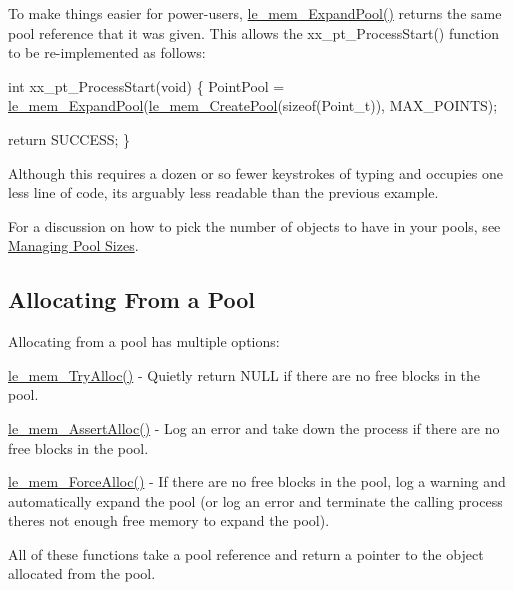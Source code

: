 To make things easier for power-\/users, {\ttfamily \hyperlink{le__mem_8h_a79a4321ffa0345f267eaf3b7d3d3528a}{le\+\_\+mem\+\_\+\+Expand\+Pool()}} returns the same pool reference that it was given. This allows the xx\+\_\+pt\+\_\+\+Process\+Start() function to be re-\/implemented as follows\+: 
\begin{DoxyCode}
\textcolor{keywordtype}{int} xx\_pt\_ProcessStart(\textcolor{keywordtype}{void})
\{
    PointPool = \hyperlink{le__mem_8h_a79a4321ffa0345f267eaf3b7d3d3528a}{le\_mem\_ExpandPool}(\hyperlink{le__mem_8h_ab91efaa2978c9c1c7b2427d25b33241c}{le\_mem\_CreatePool}(\textcolor{keyword}{sizeof}(Point\_t)), 
      MAX\_POINTS);

    \textcolor{keywordflow}{return} SUCCESS;
\}
\end{DoxyCode}


Although this requires a dozen or so fewer keystrokes of typing and occupies one less line of code, it\textquotesingle{}s arguably less readable than the previous example.

For a discussion on how to pick the number of objects to have in your pools, see \hyperlink{c_memory_mem_pool_sizes}{Managing Pool Sizes}.\hypertarget{c_memory_mem_allocating}{}\subsection{Allocating From a Pool}\label{c_memory_mem_allocating}
Allocating from a pool has multiple options\+:
\begin{DoxyItemize}
\item {\ttfamily \hyperlink{le__mem_8h_a742e4f9d621ca27493733ca781bbe187}{le\+\_\+mem\+\_\+\+Try\+Alloc()}} -\/ Quietly return N\+U\+L\+L if there are no free blocks in the pool.
\item {\ttfamily \hyperlink{le__mem_8h_a2993bf7a9705d119c96cf80cd64a56bb}{le\+\_\+mem\+\_\+\+Assert\+Alloc()}} -\/ Log an error and take down the process if there are no free blocks in the pool.
\item {\ttfamily \hyperlink{le__mem_8h_af7c289c73d4182835a26a9099f3db359}{le\+\_\+mem\+\_\+\+Force\+Alloc()}} -\/ If there are no free blocks in the pool, log a warning and automatically expand the pool (or log an error and terminate the calling process there\textquotesingle{}s not enough free memory to expand the pool).
\end{DoxyItemize}

All of these functions take a pool reference and return a pointer to the object allocated from the pool.

